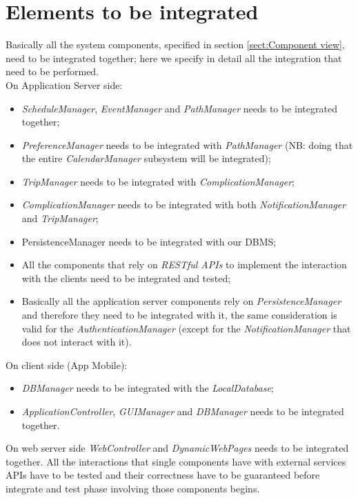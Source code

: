 \section{Elements to be integrated}
Basically all the system components, specified in section \ref{sect:Component view}, need to be integrated together; here we specify in detail all the integration that need to be performed.\\
On Application Server side:
\begin{itemize}
	\item \textit{ScheduleManager}, \textit{EventManager} and \textit{PathManager} needs to be integrated together;
	\item \textit{PreferenceManager} needs to be integrated with \textit{PathManager} (NB: doing that the entire \textit{CalendarManager} subsystem will be integrated);
	\item \textit{TripManager} needs to be integrated with \textit{ComplicationManager};
	\item \textit{ComplicationManager} needs to be integrated with both \textit{NotificationManager} and \textit{TripManager};
	\item PersistenceManager needs to be integrated with our DBMS;
	\item All the components that rely on \textit{RESTful APIs} to implement the interaction with the clients need to be integrated and tested;
	\item Basically all the application server components rely on \textit{PersistenceManager} and therefore they need to be integrated with it, the same consideration is valid for the \textit{AuthenticationManager} (except for the \textit{NotificationManager} that does not interact with it).
\end{itemize}
On client side (App Mobile):
\begin{itemize}
	\item \textit{DBManager} needs to be integrated with the \textit{LocalDatabase};
	\item \textit{ApplicationController}, \textit{GUIManager} and \textit{DBManager} needs to be integrated together.
\end{itemize}
On web server side \textit{WebController} and \textit{DynamicWebPages} needs to be integrated together.
All the interactions that single components have with external services APIs have to be tested and their correctness have to be guaranteed before integrate and test phase involving those components begins.

